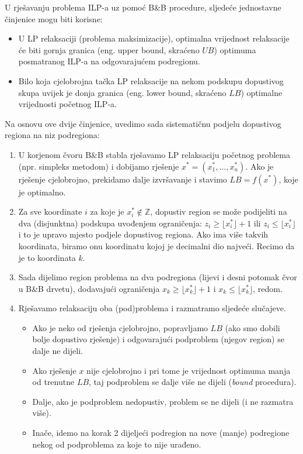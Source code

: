 \documentclass[b5paper, utf8, 11pt, colorlinks]{book}
\theoremstyle{definition}
\begin{document}
U rješavanju problema  ILP-a uz pomoć B\&B procedure, sljedeće jednostavne činjenice mogu biti korisne:
\begin{itemize}
    \item  U LP relaksaciji (problema 
           maksimizacije), optimalna vrijednost  relaksacije  će biti gornja granica (eng. upper bound, skraćeno $UB$) optimuma posmatranog ILP-a na odgovarajućem podregionu. 
    \item  Bilo koja cjelobrojna tačka LP relaksacije na nekom podskupu  
           dopustivog skupa uvijek je  donja granica (eng. lower bound, skraćeno $LB$) optimalne vrijednosti početnog ILP-a. 
\end{itemize}
Na osnovu ove dvije činjenice, uvedimo sada sistematičnu podjelu dopustivog regiona na niz podregiona:
\begin{enumerate}
    \item U korjenom čvoru B\&B stabla rješavamo LP relaksaciju početnog problema     (npr. simpleks metodom) i dobijamo rješenje $x^*=(x^*_1, \ldots, x^*_n)$.   Ako je rješenje cjelobrojno, prekidamo dalje izvršavanje i stavimo $LB=f(x^*)$, koje je optimalno. %
    \item Za sve koordinate $i$ za koje je $x^*_i \not \in \mathbb{Z}$, dopustiv region se može podijeliti na dva (disjunktna) podskupa uvođenjem ograničenja: $z_i \geq \lfloor x^*_i \rfloor + 1$ ili $z_i \leq \lfloor x^*_i \rfloor$ i to je upravo mjesto podjele dopustivog regiona. Ako ima više takvih koordinata, biramo onu koordinatu kojoj je decimalni dio najveći.  Recimo da je to koordinata $k$.
    \item Sada dijelimo region problema na dva podregiona (lijevi i desni potomak čvor u B\&B drvetu), dodavajući 
          ograničenja $x_k \geq \lfloor x^*_k \rfloor + 1$ i $x_k \leq \lfloor x^*_k \rfloor$, redom.
    \item Rješavamo relaksaciju oba (pod)problema i razmatramo sljedeće slučajeve. 
    \begin{itemize}
    	\item  Ako je neko od rješenja cjelobrojno, popravljamo $LB$ (ako smo dobili bolje dopustivo rješenje) i odgovarajući podproblem (njegov region) se dalje ne dijeli. 
    	\item Ako rješenje $x$ nije cjelobrojno i pri tome je vrijednost optimuma manja od trenutne $LB$, taj podproblem se dalje više ne dijeli (\emph{bound} procedura). 
    	\item Dalje, ako je podproblem nedopustiv, problem se ne dijeli (i ne razmatra više). 
    	\item Inače, idemo na korak 2 dijeljeći podregion   na nove (manje) podregione nekog od podproblema za koje to nije urađeno.    
    \end{itemize}

\end{enumerate}
\end{document}
